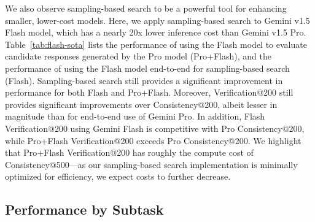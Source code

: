 \noindent
We also observe sampling-based search to be a powerful tool for enhancing smaller, lower-cost models.
Here, we apply sampling-based search to Gemini v1.5 Flash model, which has a nearly 20x lower inference cost than Gemini v1.5 Pro.
Table~\ref{tab:flash-sota} lists the performance of using the Flash model to evaluate candidate responses generated by the Pro model (Pro+Flash), and the performance of using the Flash model end-to-end for sampling-based search (Flash).
Sampling-based search still provides a significant improvement in performance for both Flash and Pro+Flash.
Moreover, Verification@200 still provides significant improvements over Consistency@200, albeit lesser in magnitude than for end-to-end use of Gemini Pro.
In addition, Flash Verification@200 using Gemini Flash is competitive with Pro Consistency@200, while Pro+Flash Verification@200 exceeds Pro Consistency@200.
We highlight that Pro+Flash Verification@200 has roughly the compute cost of Consistency@500---as our sampling-based search implementation is minimally optimized for efficiency, we expect costs to further decrease.


\subsection{Performance by Subtask}


